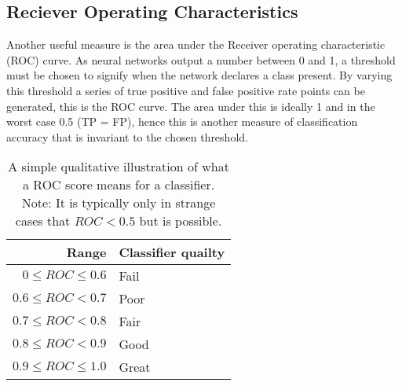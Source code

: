     \subsection{Reciever Operating Characteristics}
      Another useful measure is the area under the Receiver operating characteristic (ROC) curve.
      As neural networks output a number between 0 and 1, a threshold must be chosen to signify
      when the network declares a class present. By varying this threshold a series of true positive and false positive rate points
      can be generated, this is the ROC curve. The area under this is ideally 1 and in the worst case 0.5 (TP = FP), hence this is
      another measure of classification accuracy that is invariant to the chosen threshold.

      \begin{table}[]
        \centering \caption{A simple qualitative illustration of what a ROC score means for a classifier.
        Note: It is typically only in strange cases that $ROC< 0.5$ but is possible.} \label{my-label}
        \begin{tabular}{rl}
          \hline
          Range & Classifier quailty \\ \hline
          $0 \leq ROC \leq 0.6$   & Fail               \\
          $0.6 \leq ROC    < 0.7$   & Poor               \\
          $0.7 \leq ROC    < 0.8$   & Fair               \\
          $0.8 \leq ROC    < 0.9$   & Good               \\
          $0.9 \leq ROC \leq 1.0$   & Great              \\ \hline
        \end{tabular}
    \end{table}

